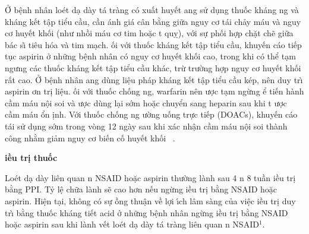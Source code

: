 \documentclass[9pt,twocolumn]{article}
\begin{document}
Ở b{\^{\d{e}}}nh nh\^{a}n lo{\'e}t d{\d{a}} d\`{a}y t\'{a} tr\`{a}ng c{\'{o}} xuất huy{{\'{\^{e}}}}t \text{\dj}ang sử d\d{u}ng thuốc kh\'{a}ng ng v\`{a} kh\'{a}ng k{{\'{\^{e}}}}t t{\^{\d{a}}}p tiểu cầu, cần \text{\dj}\'{a}nh gi\'{a} c\^{a}n bằng giữa nguy cơ t\'{a}i chảy m\'{a}u v\`{a} nguy cơ huy{{\'{\^{e}}}}t khối (như nhồi m\'{a}u cơ tim hoặc t qu\d{y}), với sự phối hợp chặt chẽ giữa b\'{a}c s{\~{\i}} ti{\^{e}}u h{\'{o}}a v\`{a} tim m{\d{a}}ch. \text{\DJ}ối với thuốc kh\'{a}ng k{{\'{\^{e}}}}t t{\^{\d{a}}}p tiểu cầu, khuy{{\'{\^{e}}}}n c\'{a}o ti{{\'{\^{e}}}}p t\d{u}c aspirin ở những b{\^{\d{e}}}nh nh\^{a}n c{\'{o}} nguy cơ huy{{\'{\^{e}}}}t khối cao, trong khi c{\'{o}} thể t{\d{a}}m ngưng c\'{a}c thuốc kh\'{a}ng k{{\'{\^{e}}}}t t{\^{\d{a}}}p tiểu cầu kh\'{a}c, trừ trường hợp nguy cơ huy{{\'{\^{e}}}}t khối rất cao. Ở b{\^{\d{e}}}nh nh\^{a}n \text{\dj}ang d\`{u}ng li{\^{\d{e}}}u ph\'{a}p kh\'{a}ng k{{\'{\^{e}}}}t t{\^{\d{a}}}p tiểu cầu k{\'e}p, n{\^{e}}n duy tr\`{\i} aspirin \text{\dj}ơn tr\d{i} li{\^{\d{e}}}u. \text{\DJ}ối với thuốc chống ng, warfarin n{\^{e}}n \text{\dj}ược t{\d{a}}m ngừng \text{\dj}ể ti{{\'{\^{e}}}}n h\`{a}nh cầm m\'{a}u n{\^{\d{o}}}i soi v\`{a} \text{\dj}ược d\`{u}ng l{\d{a}}i sớm hoặc chuyển sang heparin sau khi t \text{\dj}ược cầm m\'{a}u ổn \text{\dj}\d{i}nh. Với thuốc chống ng \text{\dj}ường uống trực ti{{\'{\^{e}}}}p (DOACs), khuy{{\'{\^{e}}}}n c\'{a}o t\'{a}i sử d\d{u}ng sớm trong v\`{o}ng 1{\textendash}2 ng\`{a}y sau khi x\'{a}c nh{\^{\d{a}}}n cầm m\'{a}u n{\^{\d{o}}}i soi th\`{a}nh c{\^o}ng nhằm giảm nguy cơ bi{{\'{\^{e}}}}n cố huy{{\'{\^{e}}}}t khối\unskip~\cite{2901310:34531814} .

\textbf{\text{\DJ}iều tr\d{i} thuốc}

Lo{\'e}t d{\d{a}} d\`{a}y li{\^{e}}n quan n NSAID hoặc aspirin thường l\`{a}nh sau 4 n 8 tuần \text{\dj}iều tr\d{i} bằng PPI. Tỷ l{\^{\d{e}}} chữa l\`{a}nh sẽ cao hơn n{{\'{\^{e}}}}u ngừng \text{\dj}iều tr\d{i} bằng NSAID hoặc aspirin. Hi{\^{\d{e}}}n t{\d{a}}i, kh{\^o}ng c{\'{o}} sự \text{\dj}ồng thu{\^{\d{a}}}n về lợi \'{\i}ch l\^{a}m s\`{a}ng của vi{\^{\d{e}}}c \text{\dj}iều tr\d{i} duy tr\`{\i} bằng thuốc kh\'{a}ng ti{{\'{\^{e}}}}t acid ở những b{\^{\d{e}}}nh nh\^{a}n  ngừng \text{\dj}iều tr\d{i} bằng NSAID hoặc aspirin sau khi l\`{a}nh v{{\'{\^{e}}}}t lo{\'e}t d{\d{a}} d\`{a}y t\'{a} tr\`{a}ng li{\^{e}}n quan n NSAID\textbf{\ensuremath{^{1}}}.
\end{document}
